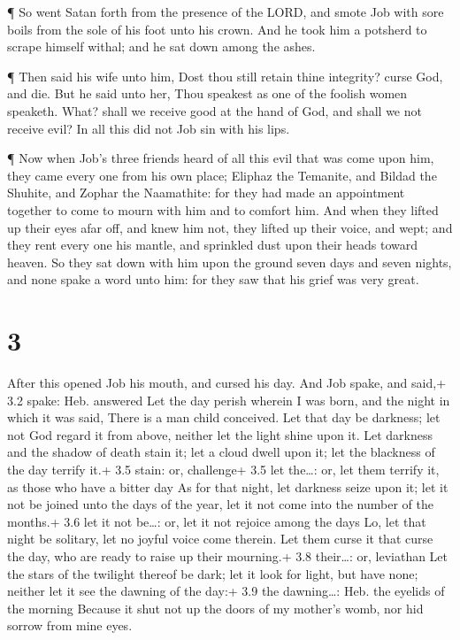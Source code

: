  ¶ So went Satan forth from the presence of the LORD, and
smote Job with sore boils from the sole of his foot unto his crown.
 And he took him a potsherd to scrape himself withal; and he
sat down among the ashes.

 ¶ Then said his wife unto him, Dost thou still retain thine
integrity? curse God, and die.  But he said unto her, Thou
speakest as one of the foolish women speaketh. What? shall we receive
good at the hand of God, and shall we not receive evil? In all this did
not Job sin with his lips.

 ¶ Now when Job's three friends heard of all this evil that
was come upon him, they came every one from his own place; Eliphaz the
Temanite, and Bildad the Shuhite, and Zophar the Naamathite: for they
had made an appointment together to come to mourn with him and to
comfort him.  And when they lifted up their eyes afar off,
and knew him not, they lifted up their voice, and wept; and they rent
every one his mantle, and sprinkled dust upon their heads toward heaven.
 So they sat down with him upon the ground seven days and
seven nights, and none spake a word unto him: for they saw that his
grief was very great.

\hypertarget{section-2}{%
\section{3}\label{section-2}}

 After this opened Job his mouth, and cursed his day.
 And Job spake, and said,+ 3.2 spake: Heb. answered
 Let the day perish wherein I was born, and the night in
which it was said, There is a man child conceived.  Let that
day be darkness; let not God regard it from above, neither let the light
shine upon it.  Let darkness and the shadow of death stain
it; let a cloud dwell upon it; let the blackness of the day terrify it.+
3.5 stain: or, challenge+ 3.5 let the\ldots: or, let them terrify it, as
those who have a bitter day  As for that night, let darkness
seize upon it; let it not be joined unto the days of the year, let it
not come into the number of the months.+ 3.6 let it not be\ldots: or,
let it not rejoice among the days  Lo, let that night be
solitary, let no joyful voice come therein.  Let them curse
it that curse the day, who are ready to raise up their mourning.+ 3.8
their\ldots: or, leviathan  Let the stars of the twilight
thereof be dark; let it look for light, but have none; neither let it
see the dawning of the day:+ 3.9 the dawning\ldots: Heb. the eyelids of
the morning  Because it shut not up the doors of my
mother's womb, nor hid sorrow from mine eyes.

